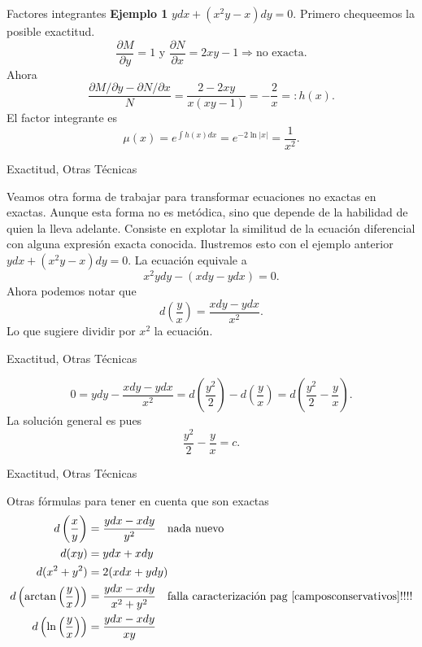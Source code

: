 \documentclass[handout,hyperref={colorlinks=true}]{beamer}
\newcommand{\der}[2]{\frac{\partial #1}{\partial #2}}
\begin{document}
\begin{frame}{Factores integrantes}
\textbf{Ejemplo 1} $ydx+(x^2y-x)dy=0$.
Primero chequeemos la posible exactitud.
\[\der{M}{y}=1\text{ y } \der{N}{x}=2xy-1\Longrightarrow\text{no exacta}.\]
Ahora 
\[\frac{\partial M/\partial y-\partial N/\partial x}{N}=\frac{2-2xy}{x(xy-1)}=-\frac{2}{x}=:h(x).\]
El factor integrante es
\[\mu(x)=e^{\int h(x)dx}=e^{-2\ln |x|}=\frac{1}{x^2}.\]

\end{frame}


\begin{frame}{Exactitud, Otras Técnicas}

Veamos otra forma de trabajar para transformar ecuaciones no exactas en exactas. Aunque esta forma no es metódica, sino  que depende de la habilidad 
de quien la lleva adelante. Consiste en explotar la similitud de la ecuación diferencial con alguna expresión exacta conocida. Ilustremos esto con el ejemplo anterior 
$ydx+(x^2y-x)dy=0$. La ecuación equivale a
\[x^2ydy-(xdy-ydx)=0.\]
Ahora podemos notar que 
\[d\left(\frac{y}{x}\right)=\frac{xdy-ydx}{x^2}.\]
Lo que sugiere dividir por $x^2$ la ecuación.

\end{frame}

\begin{frame}{Exactitud, Otras Técnicas}

\[0=ydy-\frac{xdy-ydx}{x^2}=d\left(\frac{y^2}{2}\right)-d\left(\frac{y}{x}\right)=d\left(\frac{y^2}{2}-\frac{y}{x}\right).\]
La solución general es pues
\[\frac{y^2}{2}-\frac{y}{x}=c.\]

\end{frame}

\begin{frame}{Exactitud, Otras Técnicas}

Otras fórmulas para tener en cuenta que son exactas
 \begin{align}
  d\left(\frac{x}{y}\right)&=\frac{ydx-xdy}{y^2}\quad\text{nada nuevo} \\
  d(xy)&=ydx+xdy\\
  d(x^2+y^2)&=2(xdx+ydy)\label{eq:exacta_mod2}\\
  d\left( \arctan\left(\frac{y}{x} \right) \right)&=\frac{ydx-xdy}{x^2+y^2}\quad\text{falla caracterización pag \ref{camposconservativos}!!!!}\nonumber\\
  d\left( \ln\left(\frac{y}{x} \right) \right)&=\frac{ydx-xdy}{xy}
  \end{align}


\end{frame}
\end{document}

